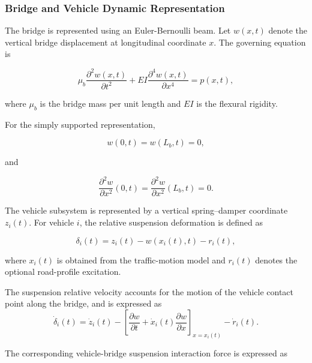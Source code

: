 \documentclass[journal]{IEEEtran}
\begin{document}
\subsubsection{Bridge and Vehicle Dynamic Representation}

The bridge is represented using an Euler-Bernoulli beam. Let $w(x,t)$ denote the vertical bridge displacement at longitudinal coordinate $x$. The governing equation is

\begin{equation}
\mu_b
\frac{\partial^2 w(x,t)}{\partial t^2}
+
EI
\frac{\partial^4 w(x,t)}{\partial x^4}
=
p(x,t),
\end{equation}

where $\mu_b$ is the bridge mass per unit length and $EI$ is the flexural rigidity.

For the simply supported representation,

\begin{equation}
w(0,t)=w(L_b,t)=0,
\end{equation}

and

\begin{equation}
\frac{\partial^2 w}{\partial x^2}(0,t)
=
\frac{\partial^2 w}{\partial x^2}(L_b,t)
=
0.
\end{equation}

The vehicle subsystem is represented by a vertical spring--damper
coordinate $z_i(t)$. For vehicle $i$, the relative suspension deformation is defined as

\begin{equation}
\delta_i(t)
=
z_i(t)
-
w\!\left(x_i(t),t\right)
-
r_i(t),
\end{equation}

where $x_i(t)$ is obtained from the traffic-motion model and $r_i(t)$ denotes the optional road-profile excitation.



The suspension relative velocity accounts for the
motion of the vehicle contact point along the bridge,
and is expressed as
\begin{equation}
\dot{\delta}_i(t)
=
\dot{z}_i(t)
-
\left[
\frac{\partial w}{\partial t}
+
\dot{x}_i(t)\frac{\partial w}{\partial x}
\right]_{x=x_i(t)}
-
\dot{r}_i(t).
\label{eq:relative_velocity}
\end{equation}




The corresponding vehicle-bridge suspension interaction force is expressed as
\end{document}
